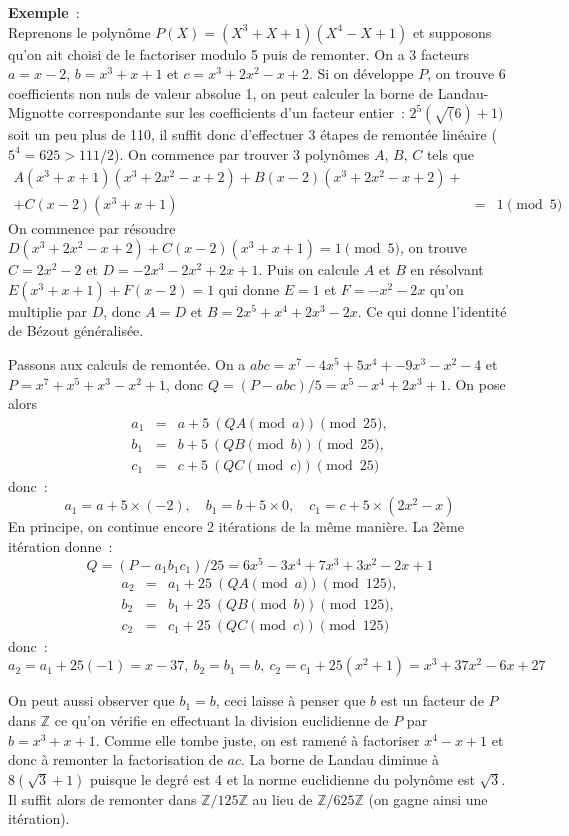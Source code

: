 \documentclass[a4paper,11pt]{article}
\newcommand{\Z}{{\mathbb{Z}}}
\begin{document}
\begin{giacjshere}
{\bf Exemple}~:\\ 
Reprenons le polynôme $P(X)=(X^3+X+1)(X^4-X+1)$
et supposons qu'on ait choisi de le factoriser modulo 5 puis 
de remonter. On a 3 facteurs
$a=x-2$, $b=x^3+x+1$ et $c=x^3+2x^2-x+2$. Si on développe $P$, on trouve 6
coefficients non nuls de valeur absolue 1, 
on peut calculer la borne de Landau-Mignotte correspondante
sur les coefficients d'un facteur entier~: $2^{5} (\sqrt(6)+1)$
soit un peu plus de 110, il suffit donc d'effectuer 3 étapes de
remontée linéaire ($5^4=625>111/2$).
On commence par trouver 3 polynômes $A$, $B$, $C$ tels que
\begin{eqnarray*}
A(x^3+x+1)(x^3+2x^2-x+2)+B(x-2)(x^3+2x^2-x+2)+& & \\
+C(x-2)(x^3+x+1)&=&1 \pmod 5
\end{eqnarray*}
On commence par résoudre $D(x^3+2x^2-x+2)+C(x-2)(x^3+x+1)=1\pmod 5$,
on trouve $C=2x^2-2$ et $D=-2x^3-2x^2+2x+1$. Puis on calcule
$A$ et $B$ en résolvant $E(x^3+x+1)+F(x-2)=1$ qui donne $E=1$ et 
$F=-x^2-2x$ qu'on multiplie par $D$, donc $A=D$ et $B=2x^5+x^4+2x^3-2x$.
Ce qui donne l'identité de Bézout généralisée.

Passons aux calculs de remontée. On a $abc=x^7-4x^5+5x^4+-9x^3-x^2-4$
et $P=x^7+x^5+x^3-x^2+1$, donc $Q=(P-abc)/5=x^5-x^4+2x^3+1$. On pose
alors 
\begin{eqnarray*} 
a_1&=&a+5 \ (QA \pmod a)\pmod{25}, \\
b_1&=&b+5 \ (QB \pmod b) \pmod{25}, \\
c_1&=&c+5 \ (QC \pmod c) \pmod{25} 
\end{eqnarray*}
donc~:
\[ a_1= a+5 \times (-2), \quad b_1=b+5 \times 0, 
\quad c_1=c+5 \times (2x^2-x) \]
En principe, on continue encore 2 itérations de la même manière.
La 2ème itération donne~: 
\[ Q=(P-a_1 b_1 c_1)/25= 6x^5-3x^4+7x^3+3x^2-2x+1\] 
\begin{eqnarray*} 
a_2&=&a_1+25 \ (QA \pmod a) \pmod{125}, \\
b_2&=&b_1+25 \ (QB \pmod b) \pmod{125},\\
c_2&=&c_1+25 \ (QC \pmod c) \pmod{125}
\end{eqnarray*}
donc~:
\[ a_2=a_1 +25(-1)=x-37, \ b_2=b_1=b, \ c_2=c_1+25(x^2+1) 
=x^3+37x^2-6x+27 \]

On peut aussi observer que $b_1=b$, ceci laisse à penser que $b$ est 
un facteur de $P$ dans $\Z$ ce qu'on vérifie en effectuant la
division euclidienne de $P$ par $b=x^3+x+1$. Comme elle tombe
juste, on est ramené à factoriser $x^4-x+1$ et donc à remonter
la factorisation de $ac$. La borne de Landau diminue à $8(\sqrt{3}+1)$
puisque le degré est 4 et la norme euclidienne du polynôme est $\sqrt{3}$.
Il suffit alors de remonter dans $\Z/125 \Z$ au lieu de $\Z/625 \Z$
(on gagne ainsi une itération).


\end{giacjshere}
\end{document}

